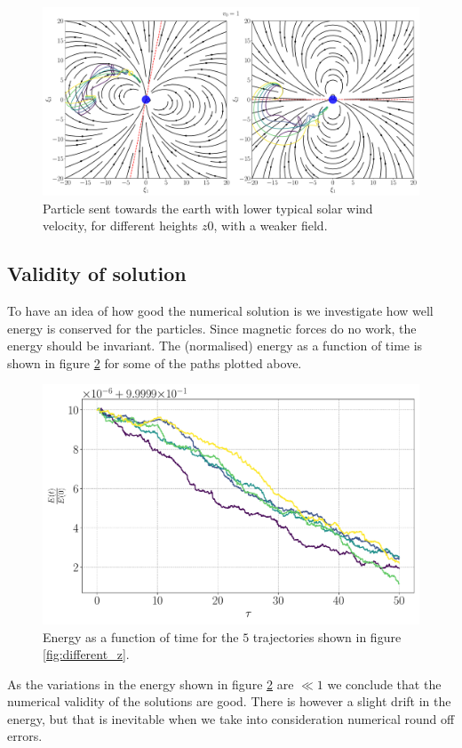 \begin{figure}[htb]
	\centering
	\includegraphics[width=\columnwidth]{../fig/strong_traj_diffz.pdf}
	\caption{Particle sent towards the earth with lower typical solar wind velocity, for different heights $z0$, with a weaker field.}
	\label{fig:weak_different_z}
\end{figure}

\subsection{Validity of solution}

To have an idea of how good the numerical solution is we investigate how well energy is conserved for the particles. Since magnetic forces do no work, the energy should be invariant. The (normalised) energy as a function of time is shown in figure \ref{fig:energy} for some of the paths plotted above.

\begin{figure}[htb]
	\centering
	\includegraphics[width=0.8\columnwidth]{../fig/energy.pdf}
	\caption{Energy as a function of time for the $5$ trajectories shown in figure \ref{fig:different_z}.}
	\label{fig:energy}
\end{figure}

As the variations in the energy shown in figure \ref{fig:energy} are $\ll 1$ we conclude that the numerical validity of the solutions are good. There is however a slight drift in the energy, but that is inevitable when we take into consideration numerical round off errors. 
 